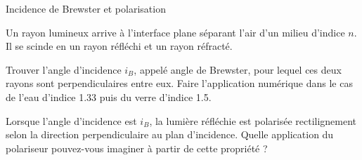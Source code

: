 \begin{exo}[PCSI]{Incidence de Brewster et polarisation}

Un rayon lumineux arrive à l'interface plane séparant l'air d'un milieu d'indice $n$. Il se scinde en un rayon réfléchi et un rayon réfracté.
\begin{quest}
\item Trouver l'angle d'incidence $i_B$, appelé angle de Brewster, pour lequel ces deux rayons sont perpendiculaires entre eux. Faire l'application numérique dans le cas de l'eau d'indice 1.33 puis du verre d'indice 1.5.
\item Lorsque l'angle d'incidence est $i_B$, la lumière réfléchie est polarisée rectilignement selon la direction perpendiculaire au plan d'incidence. Quelle application du polariseur pouvez-vous imaginer à partir de cette propriété ?
\end{quest}
\end{exo}

